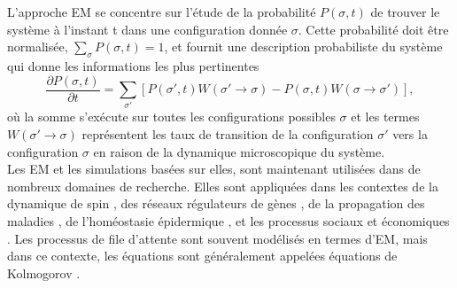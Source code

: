 L'approche EM se concentre sur l'étude de la probabilité $P(\sigma,t)$ de trouver le système à l'instant t dans une configuration donnée $\sigma$. Cette probabilité doit être normalisée, $\sum_{\sigma}P(\sigma,t)=1$, et fournit une description probabiliste du système qui donne les informations les plus pertinentes
\begin{equation}
\frac{\partial P(\sigma,t)}{\partial t}=\sum_{\sigma'}[P(\sigma',t)W(\sigma'\rightarrow \sigma)-P(\sigma,t)W(\sigma\rightarrow \sigma')],
\end{equation}
où la somme s'exécute sur toutes les configurations possibles $\sigma$ et les termes $W(\sigma'\rightarrow \sigma)$ représentent les taux de transition de la configuration $\sigma'$ vers la configuration $\sigma$ en raison de la dynamique microscopique du système.\\ 
Les EM et les simulations basées sur elles, sont maintenant utilisées dans de nombreux domaines de recherche. Elles sont appliquées dans les contextes de la dynamique de spin \cite{Glauber1963,Kawasaki1966-1,Kawasaki1966-2,Kawasaki1966-3}, des réseaux régulateurs de gènes \cite{Walczak-al2009,Rao-al2002,Tsimring2014}, de la propagation des maladies \cite{Bailey1950,Rock2014}, de l'homéostasie épidermique \cite{Clayton-al2007}, et les processus sociaux et économiques \cite{Weidlich-Braun1992}. Les processus de file d'attente sont souvent modélisés en termes d'EM, mais dans ce contexte, les équations sont généralement appelées équations de Kolmogorov \cite{Gross-al2008}. 

